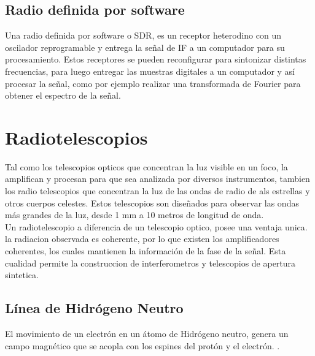 \subsection{Radio definida por software}

Una radio definida por software o SDR, es un receptor heterodino con un oscilador reprogramable y entrega la señal de IF a un computador para su procesamiento. Estos receptores se pueden reconfigurar para sintonizar distintas frecuencias, para luego entregar las muestras digitales a un computador y así procesar la señal, como por ejemplo realizar una transformada de Fourier para obtener el espectro de la señal.\\





\section{Radiotelescopios}

Tal como los telescopios opticos que concentran la luz visible en un foco, la amplifican y procesan para que sea analizada por diversos instrumentos, tambien los radio telescopios que concentran la luz de las ondas de radio de als estrellas y otros cuerpos celestes. Estos telescopios son diseñados para observar las ondas más grandes de la luz, desde 1 mm a 10 metros de longitud de onda. \cite{nraoRadioTelescopes}\\

Un radiotelescopio a diferencia de un telescopio optico, posee una ventaja unica. la radiacion observada es coherente, por lo que existen los amplificadores coherentes, los cuales mantienen la información de la fase de la señal. Esta cualidad permite la construccion de interferometros y telescopios de apertura sintetica\cite{Ransom2016}.\\ 

\subsection{Línea de Hidrógeno Neutro}

El movimiento de un electrón en un átomo de Hidrógeno neutro, genera un campo magnético que se acopla con los espines del protón y el electrón.  \cite{Restrepo2023}.\\

